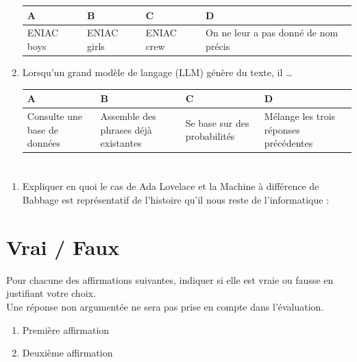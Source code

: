 \documentclass[oneside,12pt]{exam}          %
\begin{document}
\begin{enumerate}[label=\underline{Question \no\arabic*} :  , leftmargin=* , itemsep=0mm]
		\hspace{\linewidth-\textwidth}
		\renewcommand{\arraystretch}{1.1}
		\begin{tabular}{| P{0.22\textwidth} | P{0.22\textwidth} | P{0.22\textwidth} | P{0.22\textwidth} |} \hline
			A & B & C & D \\ \hline
			ENIAC boys & ENIAC girls & ENIAC crew &  On ne leur a pas donné de nom précis \\ \hline
		\end{tabular}
		
		
	\item Lorsqu'un grand modèle de langage (LLM) génère du texte, il \ldots
	
		\hspace{\linewidth-\textwidth}
		\renewcommand{\arraystretch}{1.1}
		\begin{tabular}{| P{0.22\textwidth} | P{0.22\textwidth} | P{0.22\textwidth} | P{0.22\textwidth} |} \hline
			A & B & C & D \\ \hline
			Consulte une base de données & Assemble des phrases déjà existantes & Se base sur des probabilités &  Mélange les trois réponses précédentes \\ \hline
		\end{tabular}
		
\end{enumerate}



\newpage
{}


\section{}
\begin{enumerate}
	\item Expliquer en quoi le cas de Ada Lovelace et la Machine à différence de Babbage est représentatif de l’histoire qu’il nous reste de l’informatique : 
\end{enumerate}



\section{Vrai / Faux}
Pour chacune des affirmations suivantes, indiquer si elle est vraie ou fausse en justifiant votre choix. \\
Une réponse non argumentée ne sera pas prise en compte dans l’évaluation.

\begin{enumerate}[label=\underline{Affirmation \no \arabic*} : ,leftmargin=* , itemsep=1mm]
	\item Première affirmation
	\item Deuxième affirmation
\end{enumerate}
\end{document}
